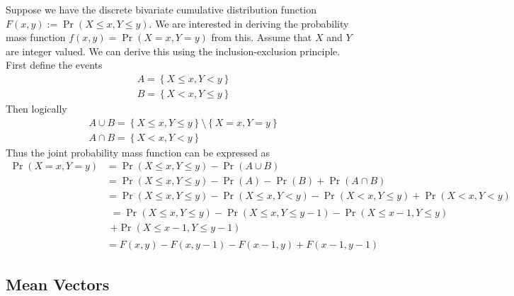 \documentclass[11pt]{report} %
\begin{document}
Suppose we have the discrete bivariate cumulative distribution function $F\left(x, y\right) := \operatorname{Pr}\left(X\leq x, Y \leq y\right)$. We are interested in deriving the probability mass function $f\left(x, y\right) = \operatorname{Pr}\left(X = x, Y = y\right)$ from this. Assume that $X$ and $Y$ are integer valued. We can derive this using the inclusion-exclusion principle. First define the events
\begin{gather}
A = \left\{X \leq x, Y < y\right\} \\
B = \left\{X < x, Y \leq y\right\}
\end{gather}
Then logically
\begin{gather}
A \cup B =  \left\{X \leq x, Y \leq y\right\}\setminus\left\{X = x, Y = y\right\} \\
A \cap B = \left\{X < x, Y < y\right\}
\end{gather}
Thus the joint probability mass function can be expressed as
\begin{align}
\operatorname{Pr}\left(X = x, Y = y\right) &= \operatorname{Pr}\left(X \leq x, Y \leq y\right) - \operatorname{Pr}\left(A \cup B\right) \\
&= \operatorname{Pr}\left(X \leq x, Y \leq y\right) - \operatorname{Pr}\left(A\right) - \operatorname{Pr}\left(B\right) + \operatorname{Pr}\left(A \cap B\right) \\
&= \operatorname{Pr}\left(X \leq x, Y \leq y\right) - \operatorname{Pr}\left(X \leq x, Y < y\right) - \operatorname{Pr}\left(X < x, Y \leq y\right) + \operatorname{Pr}\left(X < x, Y < y\right) \\
&\begin{multlined} =\operatorname{Pr}\left(X \leq x, Y \leq y\right) - \operatorname{Pr}\left(X \leq x, Y \leq y - 1\right) - \operatorname{Pr}\left(X \leq x - 1, Y \leq y\right) \\
+ \operatorname{Pr}\left(X \leq x - 1, Y \leq y - 1\right) \end{multlined} \\
&= F\left(x, y\right) - F\left(x, y - 1\right) - F\left(x - 1, y\right) + F\left(x - 1, y - 1\right)
\end{align}

\subsection{Mean Vectors}
\end{document}
